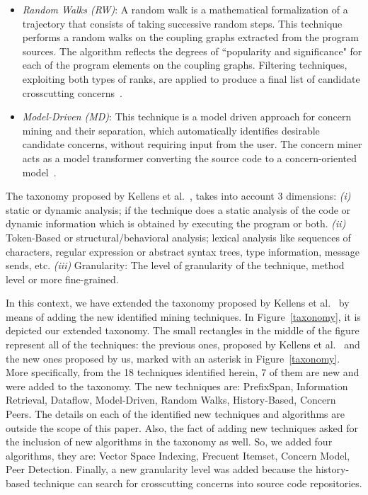 \begin{itemize}
\item \textit{Random Walks (RW)}: A random walk is a mathematical formalization of a trajectory that consists of taking successive random steps. This technique performs a random walks on the coupling graphs extracted from the program sources. The algorithm reflects the degrees of ``popularity and significance" for each of the program elements on the coupling graphs. Filtering techniques, exploiting both types of ranks, are applied to produce a final list of candidate crosscutting concerns~\cite{CharlesZhang2011}.

\item \textit{Model-Driven (MD)}: This technique is a model driven approach for concern mining and their separation, which automatically identifies desirable candidate concerns, without requiring input from the user. The concern miner acts as a model transformer converting the source code to a concern-oriented model~\cite{Nora}.

\end{itemize}

The taxonomy proposed by Kellens et al.~\cite{Kellens}, takes into account 3 dimensions: \textit{(i)} static or dynamic analysis; if the technique does a static analysis of the code or dynamic information which is obtained by executing the program or both. \textit{(ii)} Token-Based or structural/behavioral analysis; lexical analysis like sequences of characters, regular expression or abstract syntax trees, type information, message sends, etc. \textit{(iii)} Granularity: The level of granularity of the technique, method level or more fine-grained. 

In this context, we have extended the taxonomy proposed by Kellens et al.~\cite{Kellens} by means of adding the new identified mining techniques. In Figure~\ref{taxonomy}, it is depicted our extended taxonomy. The small rectangles in the middle of the figure represent all of the techniques: the previous ones, proposed by Kellens et al.~\cite{Kellens} and the new ones proposed by us, marked with an asterisk in Figure~\ref{taxonomy}. More specifically, from the 18 techniques identified herein, 7 of them are new and were added to the taxonomy. The new techniques are: PrefixSpan, Information Retrieval, Dataflow, Model-Driven, Random Walks, History-Based, Concern Peers. The details on each of the identified new techniques and algorithms are outside the scope of this paper. Also, the fact of adding new techniques asked for the inclusion of new algorithms in the taxonomy as well. So, we added four algorithms, they are: Vector Space Indexing, Frecuent Itemset, Concern Model, Peer Detection. 
Finally, a new granularity level was added because the history-based technique can search for crosscutting concerns into source code repositories. 

